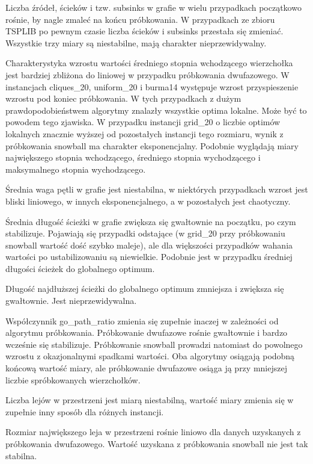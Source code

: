 Liczba źródeł, ścieków i tzw. subsinks w grafie w wielu przypadkach początkowo rośnie, by nagle zmaleć na końcu próbkowania.
W przypadkach ze zbioru TSPLIB po pewnym czasie liczba ścieków i subsinks przestała się zmieniać.
Wszystkie trzy miary są niestabilne, mają charakter nieprzewidywalny.

Charakterystyka wzrostu wartości średniego stopnia wchodzącego wierzchołka jest bardziej zbliżona do liniowej
w przypadku próbkowania dwufazowego. W instancjach cliques\_20, uniform\_20 i burma14 występuje
wzrost przyspieszenie wzrostu pod koniec próbkowania.
W tych przypadkach z dużym prawdopodobieństwem algorytmy znalazły wszystkie optima lokalne.
Może być to powodem tego zjawiska.
W przypadku instancji grid\_20 o liczbie optimów lokalnych znacznie wyższej od pozostałych instancji tego rozmiaru,
wynik z próbkowania snowball ma charakter eksponencjalny.
Podobnie wyglądają miary największego stopnia wchodzącego, średniego stopnia wychodzącego i maksymalnego stopnia wychodzącego.

Średnia waga pętli w grafie jest niestabilna, w niektórych przypadkach wzrost jest bliski liniowego, w innych
eksponencjalnego, a w pozostałych jest chaotyczny.

Średnia długość ścieżki w grafie zwiększa się gwałtownie na początku, po czym stabilizuje.
Pojawiają się przypadki odstające (w grid\_20 przy próbkowaniu snowball wartość dość szybko maleje),
ale dla większości przypadków wahania wartości po ustabilizowaniu są niewielkie.
Podobnie jest w przypadku średniej długości ścieżek do globalnego optimum.

Długość najdłuższej ścieżki do globalnego optimum zmniejsza i zwiększa się gwałtownie.
Jest nieprzewidywalna.

Współczynnik go\_path\_ratio zmienia się zupełnie inaczej w zależności od algorytmu próbkowania.
Próbkowanie dwufazowe rośnie gwałtownie i bardzo wcześnie się stabilizuje.
Próbkowanie snowball prowadzi natomiast do powolnego wzrostu z okazjonalnymi spadkami wartości.
Oba algorytmy osiągają podobną końcową wartość miary, ale próbkowanie dwufazowe osiąga ją przy mniejszej
liczbie spróbkowanych wierzchołków.

Liczba lejów w przestrzeni jest miarą niestabilną, wartość miary zmienia się w zupełnie inny sposób
dla różnych instancji.

Rozmiar największego leja w przestrzeni rośnie liniowo dla danych uzyskanych z próbkowania
dwufazowego. Wartość uzyskana z próbkowania snowball nie jest tak stabilna.


